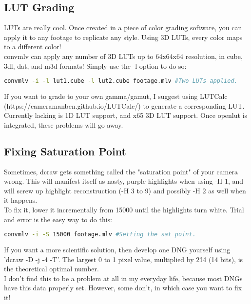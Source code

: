 \documentclass[a4paper,12pt]{article}
\begin{document}
	\subsection{LUT Grading}
		LUTs are really cool. Once created in a piece of color grading software, you can apply it to any footage to replicate any style. Using 3D LUTs, every
		color maps to a different color!\\
		
		convmlv can apply any number of 3D LUTs up to 64x64x64 resolution, in cube, 3dl, dat, and m3d formats! Simply use the -l option to do so:
		
\begin{lstlisting}[language=bash]
	convmlv -i -l lut1.cube -l lut2.cube footage.mlv #Two LUTs applied.
\end{lstlisting}
		
		If you want to grade to your own gamma/gamut, I suggest using LUTCalc (https://cameramanben.github.io/LUTCalc/) to generate a corresponding LUT.\\
		
		Currently lacking is 1D LUT support, and x65 3D LUT support. Once openlut is integrated, these problems will go away.
		
	\subsection{Fixing Saturation Point}
		Sometimes, dcraw gets something called the "saturation point" of your camera wrong. This will manifest itself as nasty, purple highlights when using
		-H 1, and will screw up highlight reconstruction (-H 3 to 9) and possibly -H 2 as well when it happens.\\
		
		To fix it, lower it incrementally from 15000 until the highlights turn white. Trial and error is the easy way to do this:
		
\begin{lstlisting}[language=bash]
	convmlv -i -S 15000 footage.mlv #Setting the sat point.
\end{lstlisting}
		
		If you want a more scientific solution, then develop one DNG yourself using 'dcraw -D -j -4 -T'. The largest 0 to 1 pixel value, multiplied by 2\^14 (14 bits),
		is the  theoretical optimal number.\\
		
		I don't find this to be a problem at all in my everyday life, because most DNGs have this data properly set. However, some don't, in which case you want to fix it!
\end{document}
